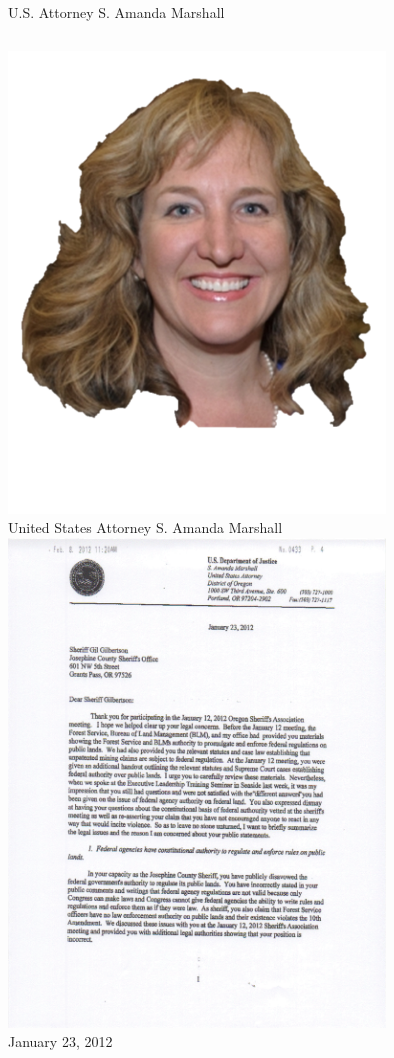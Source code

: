 \documentclass{beamer}
\begin{document}
\begin{frame}{U.S. Attorney S. Amanda Marshall}
    \begin{columns}[onlytextwidth]
            \centering
            \includegraphics[width=0.75\textwidth]{img/amanda-marshall.png} \\
            United States Attorney S. Amanda Marshall \\

            \centering
            \includegraphics[width=0.75\textwidth]{img/marshall-letter.png} \\
            January 23, 2012 \\
    \end{columns}
\end{frame}
\end{document}
